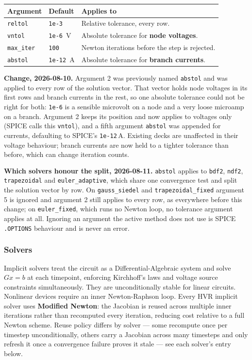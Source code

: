 \documentclass[11pt, a4paper]{article}
\newcommand{\code}[1]{\texttt{\small #1}}
\begin{document}
\begin{center}
\renewcommand{\arraystretch}{1.4}
\begin{tabular}{@{} L{2.2cm} L{2.0cm} L{9.5cm} @{}}
\toprule
\textbf{Argument} & \textbf{Default} & \textbf{Applies to} \\
\midrule
\code{reltol} & \code{1e-3} & Relative tolerance, every row. \\
\code{vntol}  & \code{1e-6}~V & Absolute tolerance for \textbf{node voltages}. \\
\code{max\_iter} & \code{100} & Newton iterations before the step is rejected. \\
\code{abstol} & \code{1e-12}~A & Absolute tolerance for \textbf{branch currents}. \\
\bottomrule
\end{tabular}
\end{center}

\textbf{Change, 2026-08-10.} Argument 2 was previously named \code{abstol}
and was applied to every row of the solution vector. That vector holds node
voltages in its first rows and branch currents in the rest, so one absolute
tolerance could not be right for both: \code{1e-6} is a sensible microvolt
on a node and a very loose microamp on a branch. Argument 2 keeps its
position and now applies to voltages only (SPICE calls this \code{vntol}),
and a fifth argument \code{abstol} was appended for currents, defaulting to
SPICE's \code{1e-12}\,A. Existing decks are unaffected in their voltage
behaviour; branch currents are now held to a tighter tolerance than before,
which can change iteration counts.

\textbf{Which solvers honour the split, 2026-08-11.} \code{abstol} applies to
\code{bdf2}, \code{ndf2}, \code{trapezoidal} and \code{euler\_adaptive}, which
share one convergence test and split the solution vector by row. On
\code{gauss\_siedel} and \code{trapezoidal\_fixed} argument 5 is ignored and
argument 2 still applies to every row, as everywhere before this change; on
\code{euler\_fixed}, which runs no Newton loop, no tolerance argument applies at
all. Ignoring an argument the active method does not use is SPICE
\code{.OPTIONS} behaviour and is never an error.

\subsubsection*{Solvers}
Implicit solvers treat the circuit as a Differential-Algebraic system and
solve $G x = b$ at each timepoint, enforcing Kirchhoff's laws and voltage
source constraints simultaneously. They are unconditionally stable for linear
circuits. Nonlinear devices require an inner Newton-Raphson loop. Every HVR
implicit solver uses \textbf{Modified Newton}: the Jacobian is reused across
multiple inner iterations rather than recomputed every iteration, reducing
cost relative to a full Newton scheme. Reuse policy differs by solver ---
some recompute once per timestep unconditionally, others carry a Jacobian
across many timesteps and only refresh it once a convergence failure proves
it stale --- see each solver's entry below.
\end{document}
